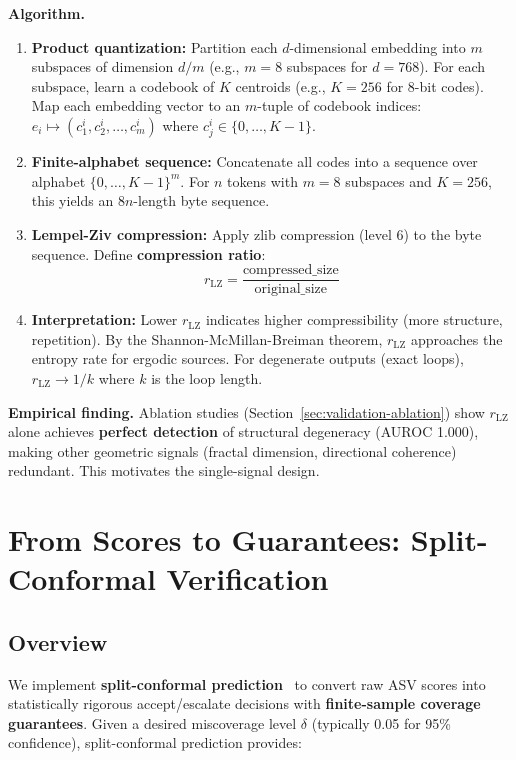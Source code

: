 \documentclass[11pt]{article}
\begin{document}
\textbf{Algorithm.}
\begin{enumerate}
\item \textbf{Product quantization:} Partition each $d$-dimensional embedding into $m$ subspaces of dimension $d/m$ (e.g., $m=8$ subspaces for $d=768$). For each subspace, learn a codebook of $K$ centroids (e.g., $K=256$ for 8-bit codes). Map each embedding vector to an $m$-tuple of codebook indices: $e_i \mapsto (c_1^i, c_2^i, \dots, c_m^i)$ where $c_j^i \in \{0,\dots,K-1\}$.

\item \textbf{Finite-alphabet sequence:} Concatenate all codes into a sequence over alphabet $\{0,\dots,K-1\}^m$. For $n$ tokens with $m=8$ subspaces and $K=256$, this yields an 8$n$-length byte sequence.

\item \textbf{Lempel-Ziv compression:} Apply zlib compression (level 6) to the byte sequence. Define \textbf{compression ratio}:
\begin{equation}
r_{\text{LZ}} = \frac{\text{compressed\_size}}{\text{original\_size}}
\end{equation}

\item \textbf{Interpretation:} Lower $r_{\text{LZ}}$ indicates higher compressibility (more structure, repetition). By the Shannon-McMillan-Breiman theorem, $r_{\text{LZ}}$ approaches the entropy rate for ergodic sources. For degenerate outputs (exact loops), $r_{\text{LZ}} \rightarrow 1/k$ where $k$ is the loop length.
\end{enumerate}

\textbf{Empirical finding.} Ablation studies (Section~\ref{sec:validation-ablation}) show $r_{\text{LZ}}$ alone achieves \textbf{perfect detection} of structural degeneracy (AUROC 1.000), making other geometric signals (fractal dimension, directional coherence) redundant. This motivates the single-signal design.

\section{From Scores to Guarantees: Split-Conformal Verification}
\label{sec:conformal}

\subsection{Overview}
\label{sec:conformal-overview}

We implement \textbf{split-conformal prediction}~\cite{vovk2005algorithmic,lei2018distribution,angelopoulos2023gentle} to convert raw ASV scores into statistically rigorous accept/escalate decisions with \textbf{finite-sample coverage guarantees}. Given a desired miscoverage level $\delta$ (typically 0.05 for 95\% confidence), split-conformal prediction provides:
\end{document}
